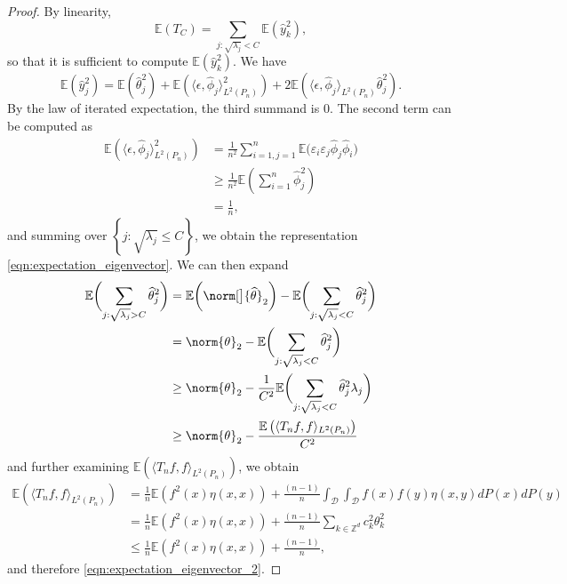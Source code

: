 \documentclass{article}
\newcommand{\set}[1]{\left\{#1\right\}}
\newcommand{\dotp}[2]{\langle #1, #2 \rangle}
\newcommand{\1}{\mathbb{I}}
\newcommand{\D}{\mathcal{D}}
\newcommand{\Ebb}{\mathbb{E}}
\theoremstyle{alden}
\theoremstyle{aldenthm}
\theoremstyle{definition}
\theoremstyle{remark}
\begin{document}
\begin{proof}
	By linearity,
	\begin{equation*}
	\Ebb(T_C) = \sum_{j:\sqrt{\lambda_j} < C} \Ebb(\widehat{y}_k^2),
	\end{equation*}
	so that it is sufficient to compute $\Ebb(\widehat{y}_k^2)$. We have
	\begin{equation*}
	\Ebb(\widehat{y}_j^2) = \Ebb\left(\widehat{\theta}_j^2\right) + \Ebb\left(\dotp{\epsilon}{\widehat{\phi}_j}_{L^2(P_n)}^2\right) + 2 \Ebb\left(\dotp{\epsilon}{\widehat{\phi}_j}_{L^2(P_n)} \widehat{\theta}_j^2\right).
	\end{equation*}
	By the law of iterated expectation, the third summand is $0$. The second term can be computed as
	\begin{align*}
	\Ebb\left(\dotp{\epsilon}{\widehat{\phi}_j}_{L^2(P_n)}^2\right) & = \frac{1}{n^2} \sum_{i = 1, j = 1}^{n} \Ebb\bigl(\varepsilon_i \varepsilon_j \widehat{\phi}_j \widehat{\phi}_i\bigr) \\
	& \geq \frac{1}{n^2} \Ebb\left(\sum_{i = 1}^{n} \widehat{\phi}_j^2 \right) \\
	& = \frac{1}{n},
	\end{align*}
	and summing over $\set{j: \sqrt{\lambda_j} \leq C}$, we obtain the representation \eqref{eqn:expectation_eigenvector}. We can then expand
	\begin{align*}
	\Ebb\biggl(\sum_{j: \sqrt{\lambda_j} > C} \widehat{\theta}_j^2 \biggr) & = \Ebb\biggl(\norm[\big]{\widehat{\theta}}_2\biggr) - \Ebb\biggl(\sum_{j: \sqrt{\lambda_j} < C} \widehat{\theta}_j^2 \biggr) \\
	& =  \norm{\theta}_2 - \Ebb\biggl(\sum_{j: \sqrt{\lambda_j} < C} \widehat{\theta}_j^2 \biggr) \\
	& \geq \norm{\theta}_2 - \frac{1}{C^2}  \Ebb\biggl(\sum_{j: \sqrt{\lambda_j} < C} \widehat{\theta}_j^2 \lambda_j \biggr) \\
	& \geq \norm{\theta}_2 - \frac{\Ebb\left(\dotp{T_nf}{f}_{L^2(P_n)}\right)}{C^2}
	\end{align*}
	and further examining $\Ebb\left(\dotp{T_nf}{f}_{L^2(P_n)}\right)$, we obtain
	\begin{align*}
	\Ebb\left(\dotp{T_nf}{f}_{L^2(P_n)}\right) & = \frac{1}{n}\Ebb(f^2(x)\eta(x,x)) + \frac{(n-1)}{n} \int_{\D} \int_{\D} f(x) f(y) \eta(x,y) dP(x) dP(y) \\
	& = \frac{1}{n}\Ebb(f^2(x)\eta(x,x)) + \frac{(n-1)}{n} \sum_{k \in \mathbb{Z}^d} c_k^2 \theta_k^2 \\
	& \leq \frac{1}{n}\Ebb(f^2(x)\eta(x,x)) + \frac{(n-1)}{n},
	\end{align*}
	and therefore \eqref{eqn:expectation_eigenvector_2}.
\end{proof}
\end{document}
